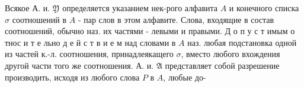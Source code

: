 \documentclass[10pt]{article}
\begin{document}
Всякое А. и. $\mathfrak{Y}$ определяется указанием нек-рого алфавита $A$ и конечного списка $\sigma$ соотношений в $A$ - пар слов в этом алфавите. Слова, входящие в состав соотношений, обычно наз. их частями - левыми и правыми. Д о п у с т имым о тнос и т е льно д е й с т в и е м над словами в $A$ наз. любая подстановка одной из частей к.-л. соотношения, принадлеякащего $\sigma$, вместо любого вхождения другой части того же соотношения. А. и. $\mathfrak{A}$ представляет собой разрешение производить, исходя из любого слова $P$ в $A$, любые до-
\end{document}
